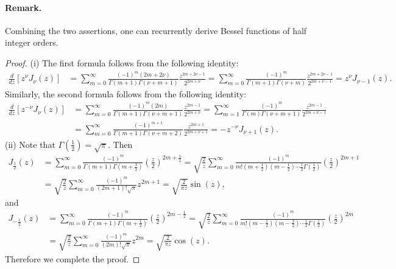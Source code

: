 \documentclass{article}
\numberwithin{equation}{section}
\theoremstyle{plain}
\theoremstyle{definition}
\begin{document}
\paragraph{Remark.} Combining the two assertions, one can recurrently derive Bessel functions of half integer orders.
\begin{proof}
(i) The first formula follows from the following identity:
\begin{align*}
	\frac{d}{dz}\left[z^\nu J_\nu(z)\right]&=\sum_{m=0}^\infty\frac{(-1)^m(2m+2\nu)}{\Gamma(m+1)\Gamma(\nu+m+1)}\frac{z^{2m+2\nu-1}}{2^{2m+\nu}}=\sum_{m=0}^\infty\frac{(-1)^m}{\Gamma(m+1)\Gamma(\nu+m)}\frac{z^{2m+2\nu-1}}{2^{2m+\nu-1}}=z^\nu J_{\nu-1}(z).
\end{align*}
Similarly, the second formula follows from the following identity:
\begin{align*}
	\frac{d}{dz}\left[z^{-\nu} J_\nu(z)\right]&=\sum_{m=0}^\infty\frac{(-1)^m(2m)}{\Gamma(m+1)\Gamma(\nu+m+1)}\frac{z^{2m-1}}{2^{2m+\nu}}=\sum_{m=1}^\infty\frac{(-1)^m}{\Gamma(m)\Gamma(\nu+m+1)}\frac{z^{2m-1}}{2^{2m+\nu-1}}\\
	&=\sum_{m=0}^\infty\frac{(-1)^{m+1}}{\Gamma(m+1)\Gamma(\nu+m+2)}\frac{z^{2m+1}}{2^{2m+\nu+1}}=-z^{-\nu} J_{\nu+1}(z).
\end{align*}
(ii) Note that $\Gamma\left(\frac{1}{2}\right)=\sqrt{\pi}$. Then
\begin{align*}
J_{\frac{1}{2}}(z)&=\sum_{m=0}^\infty\frac{(-1)^m}{\Gamma(m+1)\Gamma(m+\frac{3}{2})}\left(\frac{z}{2}\right)^{2m+\frac{1}{2}}=\sqrt{\frac{2}{z}}\sum_{m=0}^\infty\frac{(-1)^m}{m!\left(m+\frac{1}{2}\right)\left(m-\frac{1}{2}\right)\cdots\frac{1}{2}\Gamma\left(\frac{1}{2}\right)}\left(\frac{z}{2}\right)^{2m+1}\\
&=\sqrt{\frac{2}{z}}\sum_{m=0}^\infty\frac{(-1)^m}{(2m+1)!\sqrt{\pi}}z^{2m+1}=\sqrt{\frac{2}{\pi z}}\sin(z),
\end{align*}
and
\begin{align*}
	J_{-\frac{1}{2}}(z)&=\sum_{m=0}^\infty\frac{(-1)^m}{\Gamma(m+1)\Gamma(m+\frac{1}{2})}\left(\frac{z}{2}\right)^{2m-\frac{1}{2}}=\sqrt{\frac{2}{z}}\sum_{m=0}^\infty\frac{(-1)^m}{m!\left(m-\frac{1}{2}\right)\left(m-\frac{3}{2}\right)\cdots\frac{1}{2}\Gamma\left(\frac{1}{2}\right)}\left(\frac{z}{2}\right)^{2m}\\
	&=\sqrt{\frac{2}{z}}\sum_{m=0}^\infty\frac{(-1)^m}{(2m)!\sqrt{\pi}}z^{2m}=\sqrt{\frac{2}{\pi z}}\cos(z).
\end{align*}
Therefore we complete the proof.
\end{proof}
\end{document}
